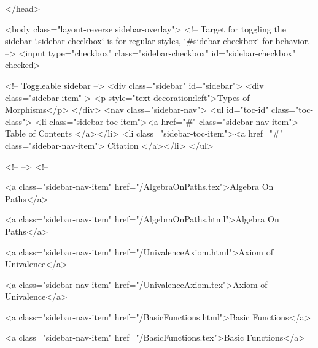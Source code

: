   
</head>




  <body class="layout-reverse sidebar-overlay">
    <!-- Target for toggling the sidebar `.sidebar-checkbox` is for regular
     styles, `#sidebar-checkbox` for behavior. -->
<input type="checkbox" class="sidebar-checkbox" id="sidebar-checkbox" checked>

<!-- Toggleable sidebar -->
<div class="sidebar" id="sidebar">
  <div class="sidebar-item" >
    <p style="text-decoration:left">Types of Morphisms</p>
  </div>
  <nav class="sidebar-nav">
    <ul id="toc-id" class="toc-class">
  <li class="sidebar-toc-item"><a href="#" class="sidebar-nav-item"> Table of Contents </a></li>
  <li class="sidebar-toc-item"><a href="#" class="sidebar-nav-item"> Citation </a></li>
</ul>


    <!--  -->
    <!-- 
      
    
      
    
      
    
      
        
      
    
      
        
          <a class="sidebar-nav-item" href="/AlgebraOnPaths.tex">Algebra On Paths</a>
        
      
    
      
        
          <a class="sidebar-nav-item" href="/AlgebraOnPaths.html">Algebra On Paths</a>
        
      
    
      
        
          <a class="sidebar-nav-item" href="/UnivalenceAxiom.html">Axiom of Univalence</a>
        
      
    
      
        
          <a class="sidebar-nav-item" href="/UnivalenceAxiom.tex">Axiom of Univalence</a>
        
      
    
      
        
          <a class="sidebar-nav-item" href="/BasicFunctions.html">Basic Functions</a>
        
      
    
      
        
          <a class="sidebar-nav-item" href="/BasicFunctions.tex">Basic Functions</a>
        
      
    
